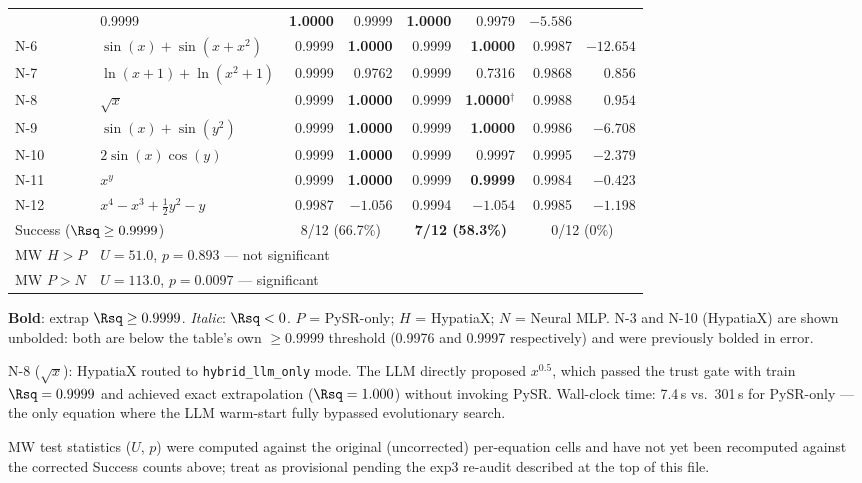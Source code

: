 \begin{table}[h]
\begin{threeparttable}
\begin{tabular}{llrrrrrr}
  & 0.9999 & \textbf{1.0000}
  & 0.9999 & \textbf{1.0000}
  & 0.9979 & $-5.586$ \\
N-6  & $\sin(x)+\sin(x+x^2)$
  & 0.9999 & \textbf{1.0000}
  & 0.9999 & \textbf{1.0000}
  & 0.9987 & $-12.654$ \\
N-7  & $\ln(x+1)+\ln(x^2+1)$
  & 0.9999 & 0.9762
  & 0.9999 & 0.7316
  & 0.9868 & $0.856$ \\
N-8  & $\sqrt{x}$
  & 0.9999 & \textbf{1.0000}
  & 0.9999 & \textbf{1.0000}$^\dag$
  & 0.9988 & $0.954$ \\
N-9  & $\sin(x)+\sin(y^2)$
  & 0.9999 & \textbf{1.0000}
  & 0.9999 & \textbf{1.0000}
  & 0.9986 & $-6.708$ \\
N-10 & $2\sin(x)\cos(y)$
  & 0.9999 & \textbf{1.0000}
  & 0.9999 & 0.9997
  & 0.9995 & $-2.379$ \\
N-11 & $x^y$
  & 0.9999 & \textbf{1.0000}
  & 0.9999 & \textbf{0.9999}
  & 0.9984 & $-0.423$ \\
N-12 & $x^4 - x^3 + \tfrac{1}{2}y^2 - y$
  & 0.9987 & $-1.056$
  & 0.9994 & $-1.054$
  & 0.9985 & $-1.198$ \\
\midrule
\multicolumn{2}{l}{Success ($\Rsq\ge0.9999$)}
  & \multicolumn{2}{c}{8/12 (66.7\%)}
  & \multicolumn{2}{c}{\textbf{7/12 (58.3\%)}}
  & \multicolumn{2}{c}{0/12 (0\%)} \\
MW $H>P$   & \multicolumn{7}{l}{$U=51.0$, $p=0.893$ — not significant} \\
MW $P>N$   & \multicolumn{7}{l}{$U=113.0$, $p=0.0097$ — significant} \\
\bottomrule
\end{tabular}
\begin{tablenotes}\small
  \item \textbf{Bold}: extrap $\Rsq \ge 0.9999$. \emph{Italic}: $\Rsq < 0$.
    $P$ = PySR-only; $H$ = HypatiaX; $N$ = Neural MLP.
    N-3 and N-10 (HypatiaX) are shown unbolded: both are below the table's
    own $\ge 0.9999$ threshold (0.9976 and 0.9997 respectively) and were
    previously bolded in error.
  \item[$\dag$] N-8 ($\sqrt{x}$): HypatiaX routed to \texttt{hybrid\_llm\_only} mode.
    The LLM directly proposed $x^{0.5}$, which passed the trust gate with
    train $\Rsq = 0.9999$ and achieved exact extrapolation ($\Rsq = 1.000$)
    without invoking PySR. Wall-clock time: 7.4\,s vs.\ 301\,s for PySR-only ---
    the only equation where the LLM warm-start fully bypassed evolutionary search.
  \item[$\ddag$] MW test statistics ($U$, $p$) were computed against the
    original (uncorrected) per-equation cells and have not yet been
    recomputed against the corrected Success counts above; treat as
    provisional pending the exp3 re-audit described at the top of this file.
\end{tablenotes}
\end{threeparttable}
\end{table}
